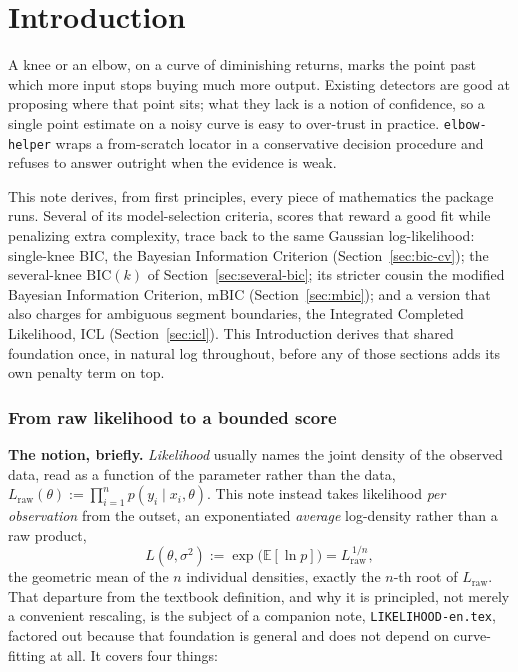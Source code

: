 \documentclass[11pt]{article}
\newcommand{\code}[1]{\texttt{#1}}
\begin{document}
\clearpage

\tableofcontents

\clearpage

\part{Introduction}
\label{sec:intro}

A knee or an elbow, on a curve of diminishing returns, marks the point
past which more input stops buying much more output. Existing detectors
are good at proposing where that point sits; what they lack is a notion
of confidence, so a single point estimate on a noisy curve is easy to
over-trust in practice. \code{elbow-helper} wraps a from-scratch locator
in a conservative decision procedure and refuses to answer outright when
the evidence is weak.

This note derives, from first principles, every piece of mathematics the
package runs. Several of its model-selection criteria, scores that reward
a good fit while penalizing extra complexity, trace back to the same
Gaussian log-likelihood: single-knee $\mathrm{BIC}$, the Bayesian
Information Criterion (Section~\ref{sec:bic-cv}); the several-knee
$\mathrm{BIC}(k)$ of Section~\ref{sec:several-bic}; its stricter cousin
the modified Bayesian Information Criterion, $\mathrm{mBIC}$
(Section~\ref{sec:mbic}); and a version that also charges for ambiguous
segment boundaries, the Integrated Completed Likelihood, $\mathrm{ICL}$
(Section~\ref{sec:icl}). This Introduction derives that shared foundation
once, in natural log throughout, before any of those sections adds its
own penalty term on top.

\section{From raw likelihood to a bounded score}
\label{sec:likelihood-intro}

\textbf{The notion, briefly.} \emph{Likelihood} usually names the joint
density of the observed data, read as a function of the parameter rather
than the data, $L_{\text{raw}}(\theta) := \prod_{i=1}^n p(y_i \mid
x_i, \theta)$. This note instead takes likelihood \emph{per observation}
from the outset, an exponentiated \emph{average} log-density rather than
a raw product,
$$L(\theta,\sigma^2) := \exp\!\big(\mathbb E[\ln p]\big) = L_{\text{raw}}^{\,1/n},$$
the geometric mean of the $n$ individual densities, exactly the $n$-th
root of $L_{\text{raw}}$. That departure from the textbook definition, and why it is principled,
not merely a convenient rescaling, is the subject of a companion note,
\code{LIKELIHOOD-en.tex}, factored out because that foundation is
general and does not depend on curve-fitting at all. It covers four
things:
\end{document}
